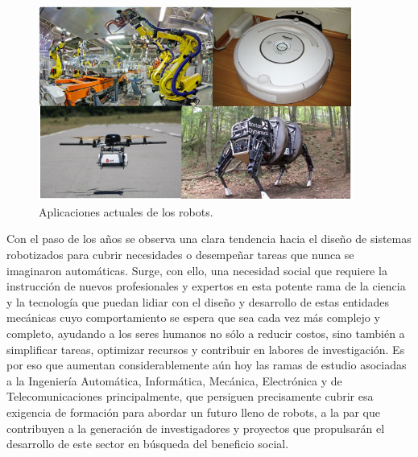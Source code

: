 \begin{figure}[!hbtp]  \centering\noindent
    \includegraphics[width=0.92\textwidth]{figures/robots.png}
    \caption{Aplicaciones actuales de los robots.}
    \label{robots}
\end{figure}

Con el paso de los años se observa una clara tendencia hacia el diseño de sistemas robotizados para cubrir necesidades o desempeñar tareas que nunca se imaginaron automáticas. Surge, con ello, una necesidad social que requiere la instrucción de nuevos profesionales y expertos en esta potente rama de la ciencia y la tecnología que puedan lidiar con el diseño y desarrollo de estas entidades mecánicas cuyo comportamiento se espera que sea cada vez más complejo y completo, ayudando a los seres humanos no sólo a reducir costos, sino también a simplificar tareas, optimizar recursos y contribuir en labores de investigación. Es por eso que aumentan considerablemente aún hoy las ramas de estudio asociadas a la Ingeniería Automática, Informática, Mecánica, Electrónica y de Telecomunicaciones principalmente, que persiguen precisamente cubrir esa exigencia de formación para abordar un futuro lleno de robots, a la par que contribuyen a la generación de investigadores y proyectos que propulsarán el desarrollo de este sector en búsqueda del beneficio social. 

